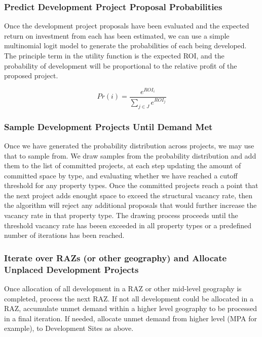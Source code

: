 \subsubsection{Predict Development Project Proposal Probabilities}
Once the development project proposals have been evaluated and the expected 
return on investment from each has been
estimated, we can use a simple multinomial logit model to generate the probabilities of each being
developed.  The principle term in the utility function is the expected ROI, and the probability of
development will be proportional to the relative profit of the proposed project.

\begin{equation}
Pr(i) = \frac{e^{ROI_i}}{\sum_{j \in J}{e^{ROI_j}}}
\end{equation}

\subsubsection{Sample Development Projects Until Demand Met}
Once we have generated the probability distribution across projects, we may use that to sample from.
We draw samples from the probability distribution and add them to the list of committed projects,
at each step updating the amount of committed space by type, and evaluating whether we have reached
a cutoff threshold for any property types.  Once the committed projects reach a point that the next
project adds enought space to exceed the structural vacancy rate, then the algorithm will reject any
additional proposals that would further increase the vacancy rate in that property type.  The drawing
process proceeds until the threshold vacancy rate has beeen exceeded in all property types or a
predefined number of iterations has been reached.

\subsubsection{Iterate over RAZs (or other geography) and Allocate Unplaced Development Projects}

Once allocation of all development in a RAZ or other mid-level geography is completed, process the
next RAZ. If not all development could be allocated in a RAZ, accumulate unmet demand within a higher
level geography to be processed in a final iteration. If needed, allocate unmet demand from higher
level (MPA for example), to Development Sites as above.

